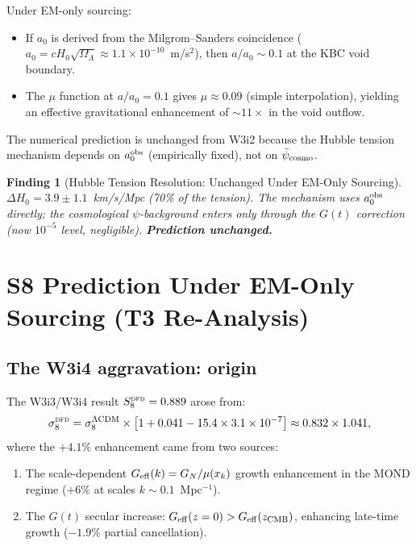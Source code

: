 \documentclass[11pt]{article}
\newtheorem{finding}{Finding}
\newcommand{\ee}[1]{\times 10^{#1}}
\newcommand{\psicosmo}{\bar{\psi}_{\rm cosmo}}
\newcommand{\GN}{G_N}
\newcommand{\Geff}{G_{\rm eff}}
\newcommand{\Hzero}{H_0}
\newcommand{\DFD}{\textsc{dfd}}
\newcommand{\LCDM}{\Lambda{\rm CDM}}
\newcommand{\mufd}{\mu}
\begin{document}
Under EM-only sourcing:
\begin{itemize}[nosep]
  \item If $a_0$ is derived from the Milgrom--Sanders coincidence
    ($a_0 = c\Hzero\sqrt{\Omega_\Lambda} \approx 1.1\ee{-10}$~m/s$^2$),
    then $a/a_0 \sim 0.1$ at the KBC void boundary.
  \item The $\mufd$ function at $a/a_0 = 0.1$ gives $\mufd \approx 0.09$
    (simple interpolation), yielding an effective gravitational
    enhancement of $\sim 11\times$ in the void outflow.
\end{itemize}

The numerical prediction is unchanged from W3i2 because the Hubble tension
mechanism depends on $a_0^{\rm obs}$ (empirically fixed), not on $\psicosmo$.

\begin{finding}[Hubble Tension Resolution: Unchanged Under EM-Only Sourcing]
\label{find:hubble-EM}
$\Delta H_0 = 3.9 \pm 1.1$~km/s/Mpc (70\% of the tension). The mechanism
uses $a_0^{\rm obs}$ directly; the cosmological $\psi$-background enters
only through the $G(t)$ correction (now $10^{-5}$ level, negligible).
\textbf{Prediction unchanged.}
\end{finding}

\section{S8 Prediction Under EM-Only Sourcing (T3 Re-Analysis)}
\label{sec:S8-EM}

\subsection{The W3i4 aggravation: origin}

The W3i3/W3i4 result $S_8^{\DFD} = 0.889$ arose from:
\begin{equation}
  \sigma_8^{\DFD} = \sigma_8^{\LCDM}\times\bigl[1 + 0.041
    - 15.4\times 3.1\ee{-7}\bigr] \approx 0.832\times 1.041,
\end{equation}
where the $+4.1\%$ enhancement came from two sources:
\begin{enumerate}[label=(\alph*)]
  \item The scale-dependent $\Geff(k) = \GN/\mufd(x_k)$ growth enhancement
    in the MOND regime ($+6\%$ at scales $k \sim 0.1$~Mpc$^{-1}$).
  \item The $G(t)$ secular increase: $\Geff(z=0) > \Geff(z_{\rm CMB})$,
    enhancing late-time growth ($-1.9\%$ partial cancellation).
\end{enumerate}
\end{document}
